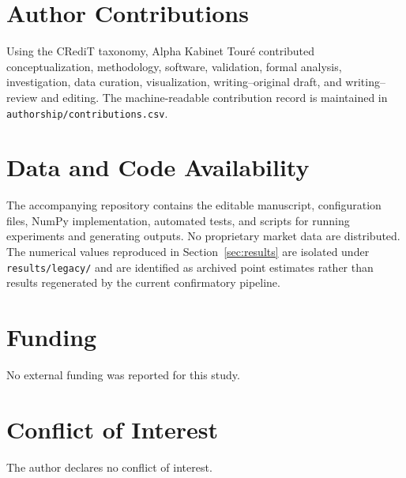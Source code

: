 \section{Author Contributions}
\label{sec:contributions}

Using the CRediT taxonomy, Alpha Kabinet Tour\'{e} contributed conceptualization,
methodology, software, validation, formal analysis, investigation, data
curation, visualization, writing--original draft, and writing--review and
editing. The machine-readable contribution record is maintained in
\texttt{authorship/contributions.csv}.

\section*{Data and Code Availability}
The accompanying repository contains the editable manuscript, configuration
files, NumPy implementation, automated tests, and scripts for running
experiments and generating outputs. No proprietary market data are distributed.
The numerical values reproduced in Section~\ref{sec:results} are isolated under
\texttt{results/legacy/} and are identified as archived point estimates rather
than results regenerated by the current confirmatory pipeline.

\section*{Funding}
No external funding was reported for this study.

\section*{Conflict of Interest}
The author declares no conflict of interest.
